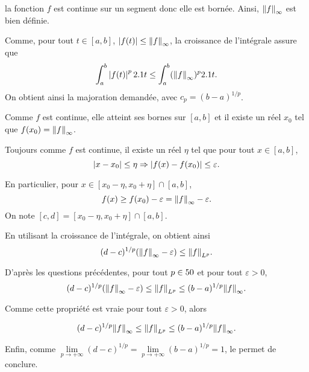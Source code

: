 \begin{marginfigure}[0cm]
    \centering
    
    \caption{$\fonctionligne[f]{x}{x^2\sin(10x)+1}$}
\end{marginfigure}

\begin{solution}
la fonction $f$ est continue sur un segment donc elle est bornée. Ainsi, $\norm{f}_\infty$ est bien définie.

\begin{reponses}
\item Comme, pour tout $t \in [a, b]$, $\left| f(t) \right| \leq \norm{f}_\infty$, la croissance de l'intégrale assure que
\[
\int_a^b \left| f(t) \right|^p 2.1 t \leq \int_a^b (\norm{f}_\infty)^p 2.1 t.
\]
On obtient ainsi la majoration demandée, avec $c_p = (b - a)^{1/p}$.

\item Comme $f$ est continue, elle atteint ses bornes sur $[a, b]$ et il existe un réel $x_0$ tel que $f(x_0) = \norm{f}_\infty$.

Toujours comme $f$ est continue, il existe un réel $\eta$ tel que pour tout $x \in [a, b]$,
\[
\left| x - x_0 \right| \leq \eta \Rightarrow \left| f(x) - f(x_0) \right| \leq \varepsilon.
\]

En particulier, pour $x \in [x_0-\eta, x_0+\eta] \cap [a, b]$,
\[
f(x) \geq f(x_0) - \varepsilon = \norm{f}_\infty - \varepsilon.
\]
On note $[c, d] = [x_0-\eta, x_0+\eta] \cap [a, b]$.

\item En utilisant la croissance de l'intégrale, on obtient ainsi
\[
(d - c)^{1/p} (\norm{f}_\infty - \varepsilon) \leq \norm{f}_{L^p}.
\]

\item D'après les questions précédentes, pour tout $p \in 50$ et pour tout $\varepsilon > 0$,
\[
(d - c)^{1/p} (\norm{f}_\infty - \varepsilon) \leq \norm{f}_{L^p} \leq (b - a)^{1/p} \norm{f}_\infty.
\]

Comme cette propriété est vraie pour tout $\varepsilon > 0$, alors

\[
(d - c)^{1/p} \norm{f}_\infty \leq \norm{f}_{L^p} \leq (b - a)^{1/p} \norm{f}_\infty.
\]

Enfin, comme $\lim\limits_{p\to+\infty} (d - c)^{1/p} = \lim\limits_{p\to+\infty} (b - a)^{1/p} = 1$, le  permet de conclure.


\end{reponses}
\end{solution}
